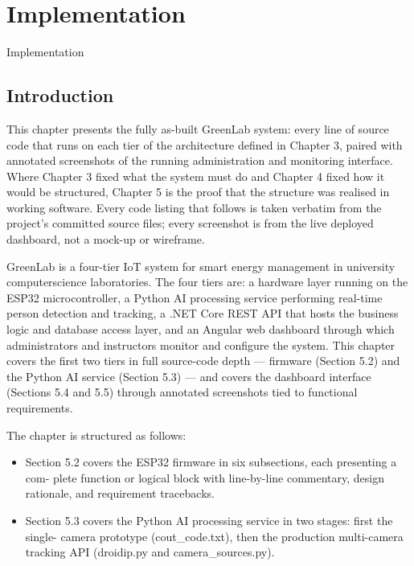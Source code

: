 
\chapter{Implementation}
\label{ch:implementation}



Implementation

\section{Introduction}


This chapter presents the fully as-built GreenLab system: every line of source code that
runs on each tier of the architecture deﬁned in Chapter 3, paired with annotated screenshots
of the running administration and monitoring interface. Where Chapter 3 ﬁxed what the
system must do and Chapter 4 ﬁxed how it would be structured, Chapter 5 is the proof that
the structure was realised in working software. Every code listing that follows is taken verbatim from the project's committed source ﬁles; every screenshot is from the live deployed
dashboard, not a mock-up or wireframe.

GreenLab is a four-tier IoT system for smart energy management in university computerscience laboratories. The four tiers are: a hardware layer running on the ESP32 microcontroller, a Python AI processing service performing real-time person detection and tracking,
a .NET Core REST API that hosts the business logic and database access layer, and an Angular web dashboard through which administrators and instructors monitor and conﬁgure
the system. This chapter covers the ﬁrst two tiers in full source-code depth --- ﬁrmware
(Section 5.2) and the Python AI service (Section 5.3) --- and covers the dashboard interface
(Sections 5.4 and 5.5) through annotated screenshots tied to functional requirements.

The chapter is structured as follows:


\begin{itemize}
  \item Section 5.2 covers the ESP32 ﬁrmware in six subsections, each presenting a com-
plete function or logical block with line-by-line commentary, design rationale, and
requirement tracebacks.
\end{itemize}

\begin{itemize}
  \item Section 5.3 covers the Python AI processing service in two stages: ﬁrst the single-
camera prototype (cout\_code.txt), then the production multi-camera tracking API
(droidip.py and camera\_sources.py).
\end{itemize}



